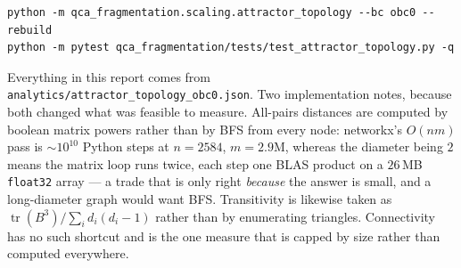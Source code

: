 \documentclass[11pt]{article}
\newcommand{\fn}[1]{\texttt{#1}}
\theoremstyle{plain}
\begin{document}
\begin{verbatim}
python -m qca_fragmentation.scaling.attractor_topology --bc obc0 --rebuild
python -m pytest qca_fragmentation/tests/test_attractor_topology.py -q
\end{verbatim}

\noindent Everything in this report comes from
\fn{analytics/attractor\_topology\_obc0.json}. Two implementation notes, because
both changed what was feasible to measure. All-pairs distances are computed by
boolean matrix powers rather than by BFS from every node: networkx's $O(nm)$ pass
is $\sim10^{10}$ Python steps at $n=2584$, $m=2.9$M, whereas the diameter being
$2$ means the matrix loop runs twice, each step one BLAS product on a $26$\,MB
\fn{float32} array --- a trade that is only right \emph{because} the answer is
small, and a long-diameter graph would want BFS. Transitivity is likewise taken
as $\operatorname{tr}(B^3)/\sum_i d_i(d_i-1)$ rather than by enumerating
triangles. Connectivity has no such shortcut and is the one measure that is
capped by size rather than computed everywhere.
\end{document}
